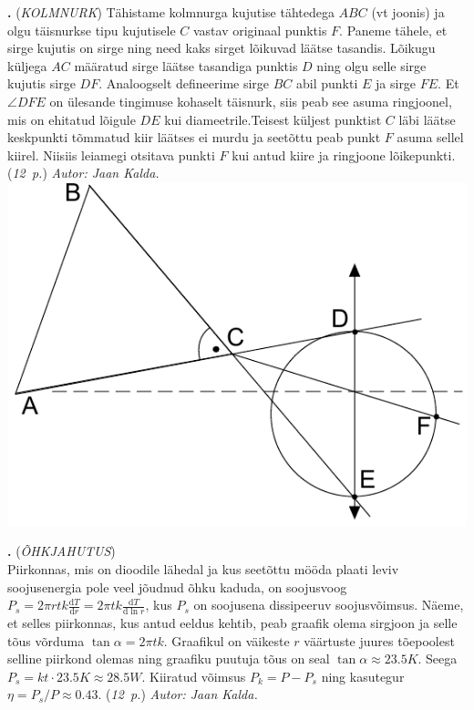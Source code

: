 \documentclass[12pt,a5paper]{article}
\newcommand{\numb}[1]{\vspace{5pt}\textbf{\large #1}}
\newcommand{\nimi}[1]{(\textsl{\small #1})}
\newcommand{\punktid}[1]{(\emph{#1~p.})}
\newcommand{\autor}[1]{\emph{ Autor: #1.}}
\newcounter{ylesanne}
\newcommand{\yl}[1]{\addtocounter{ylesanne}{1}\numb{\theylesanne.} \nimi{#1} \newblock{}}
\begin{document}
\yl{KOLMNURK}
Tähistame kolmnurga kujutise tähtedega $ABC$ (vt joonis) ja olgu täisnurkse tipu kujutisele $C$ vastav originaal punktis $F$. Paneme tähele, et sirge kujutis on sirge ning need kaks sirget lõikuvad läätse tasandis. Lõikugu küljega $AC$ määratud sirge läätse tasandiga punktis $D$ ning olgu selle sirge kujutis sirge $DF$. Analoogselt defineerime sirge 
$BC$ abil punkti $E$ ja sirge $FE$. Et $\angle DFE$ on ülesande tingimuse kohaselt täisnurk, siis peab see asuma ringjoonel, mis on ehitatud lõigule $DE$ kui diameetrile.Teisest küljest punktist $C$ läbi läätse keskpunkti tõmmatud kiir läätses ei murdu ja seetõttu peab punkt $F$ asuma sellel kiirel. Niisiis leiamegi otsitava punkti $F$ kui antud kiire ja ringjoone lõikepunkti. \punktid{12}\autor{Jaan Kalda}
\includegraphics{3nurk-lah.pdf}



\yl{ÕHKJAHUTUS}\\
Piirkonnas, mis on dioodile lähedal ja kus seetõttu mööda plaati leviv soojusenergia pole veel jõudnud õhku kaduda, on soojusvoog $P_s=2\pi rtk \frac{\mathrm d T}{\mathrm d r}=2\pi tk \frac{\mathrm d T}{\mathrm d \ln r}$, kus $P_s$ on soojusena dissipeeruv soojusvõimsus. Näeme, et selles piirkonnas, kus antud eeldus kehtib, peab graafik olema sirgjoon ja selle tõus võrduma $\tan\alpha=2\pi tk$. Graafikul on väikeste $r$ väärtuste juures tõepoolest selline piirkond olemas ning graafiku puutuja tõus on seal $\tan\alpha\approx\SI{23.5}K$. Seega $P_s=kt\cdot \SI{23.5}K\approx \SI{28.5}W$. Kiiratud võimsus $P_k=P-P_s$ ning kasutegur $\eta=P_s/P\approx 0.43$.
\punktid{12}\autor{Jaan Kalda}
\end{document}
